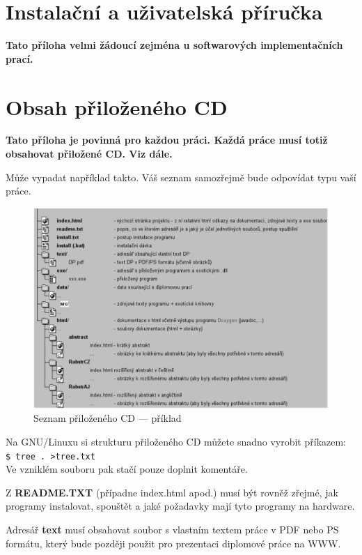 \documentclass[11pt,twoside,a4paper]{book}
\begin{document}
\chapter{Instalační a uživatelská příručka}
\textbf{\large Tato příloha velmi žádoucí zejména u softwarových implementačních prací.}

\chapter{Obsah přiloženého CD}
\textbf{\large Tato příloha je povinná pro každou práci. Každá práce musí totiž obsahovat přiložené CD. Viz dále.}

Může vypadat například takto. Váš seznam samozřejmě bude odpovídat typu vaší práce. 

\begin{figure}[h]
\begin{center}
\includegraphics[width=14cm]{figures/seznamcd}
\caption{Seznam přiloženého CD --- příklad}
\label{fig:seznamcd}
\end{center}
\end{figure}

Na GNU/Linuxu si strukturu přiloženého CD můžete snadno vyrobit příkazem:\\ 
\verb|$ tree . >tree.txt|\\
Ve vzniklém souboru pak stačí pouze doplnit komentáře.

Z \textbf{README.TXT} (případne index.html apod.)  musí být rovněž zřejmé, jak programy instalovat, spouštět a jaké požadavky mají tyto programy na hardware.

Adresář \textbf{text}  musí obsahovat soubor s vlastním textem práce v PDF nebo PS formátu, který bude později použit pro prezentaci diplomové práce na WWW.
 

\end{document}
